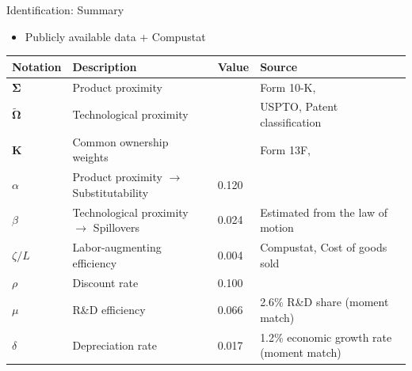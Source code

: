 \documentclass[
  10pt,
  aspectratio=169,   %
]{beamer}
\theoremstyle{plain}
\begin{document}
\begin{frame}{Identification: Summary}
  \label{identification_summary}
  \begin{itemize}
    \item Publicly available data + Compustat
  \end{itemize}
  \begin{table}[h]
    \centering
    \small %
    \begin{tabular}{llll}
      \toprule
      Notation                  & Description                                      & Value & Source                                    \\
      \midrule
      $\bm{\Sigma}$             & Product proximity                                &       & Form 10-K, \citet{Hoberg2016-jm}          \\
      $\bm{\widetilde{\Omega}}$ & Technological proximity                          &       & USPTO, Patent classification              \\
      $\bm{K}$                  & Common ownership weights                         &       & Form 13F, \citet{Backus2021-yt}           \\
      $\alpha$                  & Product proximity $\rightarrow$ Substitutability & 0.120 & \citet{Pellegrino2024-dn}                 \\
      $\beta$                   & Technological proximity $\rightarrow$ Spillovers & 0.024 & Estimated from the law of motion          \\
      $\zeta/L$                 & Labor-augmenting efficiency                      & 0.004 & Compustat, Cost of goods sold             \\
      $\rho$                    & Discount rate                                    & 0.100 &                                           \\
      $\mu$                     & R\&D efficiency                                  & 0.066 & 2.6\% R\&D share (moment match)           \\
      $\delta$                  & Depreciation rate                                & 0.017 & 1.2\% economic growth rate (moment match) \\
      \bottomrule
    \end{tabular}
  \end{table}
  \hyperlink{network_correlation}{}
\end{frame}
\end{document}

